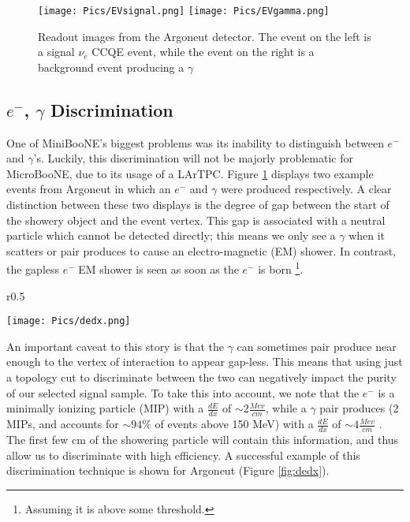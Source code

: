 \documentclass[12pt]{article}
\begin{document}
\begin{figure}[h!]
\texttt{[image: Pics/EVsignal.png]}
\hspace{2 mm}
\texttt{[image: Pics/EVgamma.png]}
\caption{Readout images from the Argoneut detector. The event on the left is a signal $\nu_e$ CCQE event, while the event on the right is a background event producing a $\gamma$} 
\label{fig:argoneut}
\end{figure}

\subsection{ $e^-$, $\gamma$ Discrimination }
 One of MiniBooNE's biggest problems was its inability to distinguish between $e^-$ and $\gamma$'s.  Luckily, this discrimination will not be majorly problematic for MicroBooNE, due to its usage of a LArTPC.  Figure \ref{fig:argoneut} displays two example events from Argoneut in which an $e^-$ and $\gamma$ were produced respectively. A clear distinction between these two displays is the degree of gap between the start of the showery object and the event vertex.  This gap is associated with a neutral particle which cannot be detected directly; this means we only see a $\gamma$ when it scatters or pair produces to cause an electro-magnetic (EM) shower. In contrast, the gapless $e^-$ EM shower is seen as soon as the $e^-$ is born \footnote{Assuming it is above some threshold.}. %
\begin{wrapfigure}{r}{0.5\textwidth}
\begin{center}
\texttt{[image: Pics/dedx.png]}
\end{center}
\caption{ $\frac{dE}{dx}$ separation of electron vs $\gamma$ \cite{szelc}}
\label{fig:dedx}
\end{wrapfigure}

\par An important caveat to this story is that the $\gamma$ can sometimes pair produce near enough to the vertex of interaction to appear gap-less.  This means that using just a topology cut to discriminate between the two can negatively impact the purity of our selected signal sample. To take this into account, we note that the $e^-$ is a minimally ionizing particle (MIP) with a $\frac{dE}{dx}$ of $\sim 2 \frac{Mev}{cm}$, while a $\gamma$ pair produces (2 MIPs, and accounts for $\sim 94\%$ of events above 150 MeV) with a $\frac{dE}{dx}$ of $\sim 4 \frac{Mev}{cm}$ \cite{szelc}. The first few cm of the showering particle will contain this information, and thus allow us to discriminate with high efficiency. A successful example of this discrimination technique is shown for Argoneut (Figure \ref{fig:dedx}).
\end{document}
